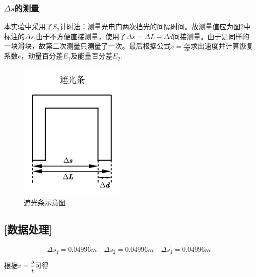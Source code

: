 \documentclass[UTF8]{article}
\begin{document}
  	\subsubsection*{$\Delta s$的测量}
  
  	\par 本实验中采用了$S_2$计时法：测量光电门两次挡光的间隔时间。故测量值应为图2中标注的$\Delta s$,由于不方便直接测量，使用了$\Delta s=\Delta L -\Delta d$间接测量。由于是同样的一块滑块，故第二次测量只测量了一次。最后根据公式$v=\frac{\Delta s}{\Delta t}$求出速度并计算恢复系数$e$，动量百分差$E_1$及能量百分差$E_2$.
  		\begin{figure}[h]
  		\centering
  		\includegraphics[width=0.3\linewidth]{遮光条}
  		\caption{遮光条示意图} %
  	\end{figure}
  \subsection*{[数据处理]}
\[\Delta s_1=0.04996m \quad \Delta s_2=0.04996m \quad \Delta s_1^{'}=0.04996m \]
	\par 根据$v = \dfrac{s}{t}$可得
\end{document}
